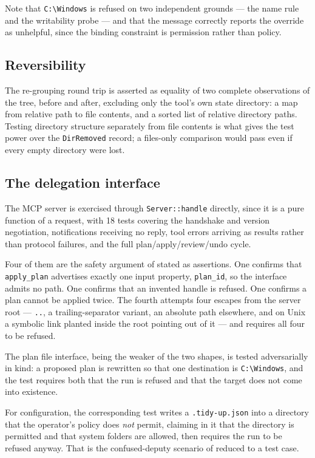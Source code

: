 \documentclass[11pt,a4paper]{article}
\newcommand{\code}[1]{\texttt{\small #1}}
\begin{document}
Note that \code{C:\textbackslash Windows} is refused on two independent grounds --- the name rule
and the writability probe --- and that the message correctly reports the override as
unhelpful, since the binding constraint is permission rather than policy.

\subsection{Reversibility}

The re-grouping round trip is asserted as equality of two complete observations of the
tree, before and after, excluding only the tool's own state directory: a map from
relative path to file contents, and a sorted list of relative directory paths. Testing
directory structure separately from file contents is what gives the test power over
the \code{DirRemoved} record; a files-only comparison would pass even if every empty
directory were lost.

\subsection{The delegation interface}
\label{sec:eval:agent}

The MCP server is exercised through \code{Server::handle} directly, since it is
a pure function of a request, with 18 tests covering the handshake and version
negotiation, notifications receiving no reply, tool errors arriving as results
rather than protocol failures, and the full plan/apply/review/undo cycle.

Four of them are the safety argument of  stated as
assertions. One confirms that \code{apply\_plan} advertises exactly one input
property, \code{plan\_id}, so the interface admits no path. One confirms that
an invented handle is refused. One confirms a plan cannot be applied twice.
The fourth attempts four escapes from the server root --- \code{..}, a
trailing-separator variant, an absolute path elsewhere, and on Unix a symbolic
link planted inside the root pointing out of it --- and requires all four to be
refused.

The plan file interface, being the weaker of the two shapes, is tested
adversarially in kind: a proposed plan is rewritten so that one destination is
\code{C:\textbackslash Windows}, and the test requires both that the run is
refused and that the target does not come into existence.

For configuration, the corresponding test writes a \code{.tidy-up.json} into a
directory that the operator's policy does \emph{not} permit, claiming in it
that the directory is permitted and that system folders are allowed, then
requires the run to be refused anyway. That is the confused-deputy scenario of
 reduced to a test case.
\end{document}
